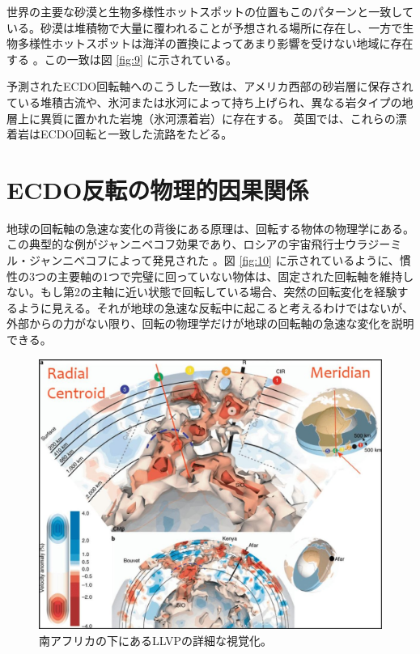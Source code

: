 \documentclass[10pt,twocolumn,letterpaper]{article}
\begin{document}
世界の主要な砂漠と生物多様性ホットスポットの位置もこのパターンと一致している。砂漠は堆積物で大量に覆われることが予想される場所に存在し、一方で生物多様性ホットスポットは海洋の置換によってあまり影響を受けない地域に存在する \cite{28}。この一致は図 \ref{fig:9} に示されている。

予測されたECDO回転軸へのこうした一致は、アメリカ西部の砂岩層に保存されている堆積古流や、氷河または氷河によって持ち上げられ、異なる岩タイプの地層上に異質に置かれた岩塊（氷河漂着岩）に存在する。\cite{21} 英国では、これらの漂着岩はECDO回転と一致した流路をたどる。\cite{67,68} 

\section{ECDO反転の物理的因果関係}

地球の回転軸の急速な変化の背後にある原理は、回転する物体の物理学にある。この典型的な例がジャンニベコフ効果であり、ロシアの宇宙飛行士ウラジーミル・ジャンニベコフによって発見された \cite{37}。図 \ref{fig:10} に示されているように、慣性の3つの主要軸の1つで完璧に回っていない物体は、固定された回転軸を維持しない。もし第2の主軸に近い状態で回転している場合、突然の回転変化を経験するように見える。それが地球の急速な反転中に起こると考えるわけではないが、外部からの力がない限り、回転の物理学だけが地球の回転軸の急速な変化を説明できる。

\begin{figure}[t]
\begin{center}
   \includegraphics[width=1\linewidth]{llvp.jpg}
\end{center}
   \caption{南アフリカの下にあるLLVPの詳細な視覚化\cite{28}。}
\label{fig:12}
\label{fig:onecol}
\end{figure}
\end{document}
